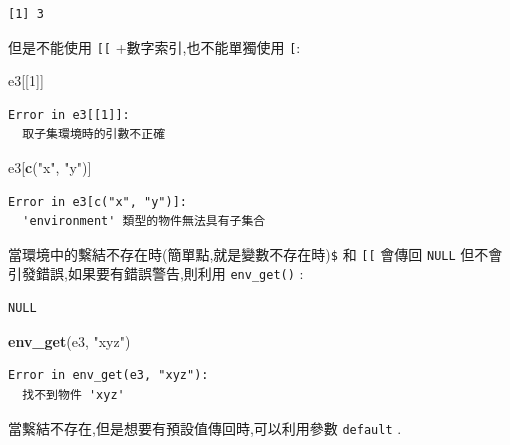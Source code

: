 \documentclass[]{book}
\newenvironment{Shaded}{\begin{snugshade}}{\end{snugshade}}
\newcommand{\DecValTok}[1]{\textcolor[rgb]{0.00,0.00,0.81}{#1}}
\newcommand{\KeywordTok}[1]{\textcolor[rgb]{0.13,0.29,0.53}{\textbf{#1}}}
\newcommand{\NormalTok}[1]{#1}
\newcommand{\OperatorTok}[1]{\textcolor[rgb]{0.81,0.36,0.00}{\textbf{#1}}}
\newcommand{\StringTok}[1]{\textcolor[rgb]{0.31,0.60,0.02}{#1}}
\theoremstyle{definition}
\theoremstyle{definition}
\theoremstyle{definition}
\theoremstyle{remark}
\begin{document}
\begin{verbatim}
[1] 3
\end{verbatim}

但是不能使用 \texttt{{[}{[}} +數字索引,也不能單獨使用 \texttt{{[}}:

\begin{Shaded}
\begin{Highlighting}[]
\NormalTok{e3[[}\DecValTok{1}\NormalTok{]]}
\end{Highlighting}
\end{Shaded}

\begin{verbatim}
Error in e3[[1]]:
  取子集環境時的引數不正確
\end{verbatim}

\begin{Shaded}
\begin{Highlighting}[]
\NormalTok{e3[}\KeywordTok{c}\NormalTok{(}\StringTok{"x"}\NormalTok{, }\StringTok{"y"}\NormalTok{)]}
\end{Highlighting}
\end{Shaded}

\begin{verbatim}
Error in e3[c("x", "y")]:
  'environment' 類型的物件無法具有子集合
\end{verbatim}

當環境中的繫結不存在時(簡單點,就是變數不存在時)\texttt{\$} 和
\texttt{{[}{[}} 會傳回 \texttt{NULL}
但不會引發錯誤,如果要有錯誤警告,則利用 \texttt{env\_get()} :

\begin{Shaded}
\end{Shaded}

\begin{verbatim}
NULL
\end{verbatim}

\begin{Shaded}
\begin{Highlighting}[]
\KeywordTok{env_get}\NormalTok{(e3, }\StringTok{"xyz"}\NormalTok{)}
\end{Highlighting}
\end{Shaded}

\begin{verbatim}
Error in env_get(e3, "xyz"):
  找不到物件 'xyz'
\end{verbatim}

當繫結不存在,但是想要有預設值傳回時,可以利用參數 \texttt{default} .
\end{document}

